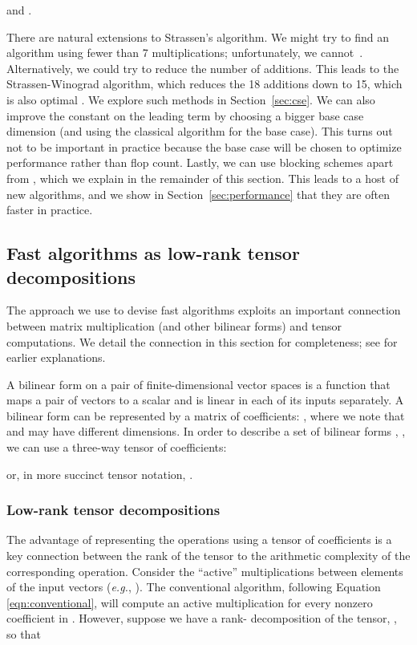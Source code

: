 \documentclass[preprint]{sigplanconf}
\begin{document}
and .


There are natural extensions to Strassen's algorithm.
We might try to find an algorithm using fewer than 7 multiplications; unfortunately, we cannot~\cite{winograd1971multiplication}.
Alternatively, we could try to reduce the number of additions.
This leads to the Strassen-Winograd algorithm, which reduces the 18 additions down to 15, which is also optimal \cite{Probert76}.
We explore such methods in Section~\ref{sec:cse}.
We can also improve the constant on the leading term by choosing a bigger base case dimension (and using the classical algorithm for the base case).
This turns out not to be important in practice because the base case will be chosen to optimize performance rather than flop count.
Lastly, we can use blocking schemes apart from , which we explain in the remainder of this section.
This leads to a host of new algorithms, and we show in Section~\ref{sec:performance} that they are often faster in practice.

\subsection{Fast algorithms as low-rank tensor decompositions}
\label{sec:tensor_fact}

The approach we use to devise fast algorithms exploits an important connection between matrix multiplication (and other bilinear forms) and tensor computations.
We detail the connection in this section for completeness; see \cite{Brent70,Kruskal77,Knuth81} for earlier explanations.



A bilinear form on a pair of finite-dimensional vector spaces is a function that maps a pair of vectors to a scalar and is linear in each of its inputs separately.
A bilinear form  can be represented by a matrix  of coefficients: , where we note that  and  may have different dimensions.
In order to describe a set of  bilinear forms , , we can use a three-way tensor  of coefficients:

or, in more succinct tensor notation, .

\subsubsection{Low-rank tensor decompositions}

The advantage of representing the operations using a tensor of coefficients is a key connection between the rank of the tensor to the arithmetic complexity of the corresponding operation.
Consider the ``active'' multiplications between elements of the input vectors (\emph{e.g.}, ).
The conventional algorithm, following Equation \eqref{eqn:conventional}, will compute an active multiplication for every nonzero coefficient in .
However, suppose we have a rank- decomposition of the tensor, , so that
\end{document}
